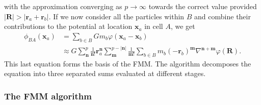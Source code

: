 with the approximation converging as $p\rightarrow\infty$ towards the
correct value provided $|\mathbf{R}|>|\mathbf{r}_a +
\mathbf{r}_b|$. If we now consider all the particles within $B$ and
combine their contributions to the potential at location
$\mathbf{x}_a$ in cell $A$, we get
\begin{align}
  \phi_{BA}(\mathbf{x}_a) &= \sum_{b\in B}G m_b\varphi(\mathbf{x}_a -
  \mathbf{x}_b)  \label{eq:fmm:fmm_one_cell}  \\
  &\approx G\sum_{\mathbf{n}}^{p}
  \frac{1}{\mathbf{n}!} \mathbf{r}_a^{\mathbf{n}} \sum_{\mathbf{m}}
    ^{p -|\mathbf{n}|}
  \frac{1}{\mathbf{m}!} \sum_{b\in B} m_b\left(-\mathbf{r}_b\right)^\mathbf{m}
  \nabla^{\mathbf{n}+\mathbf{m}} \varphi(\mathbf{R}) \nonumber. 
\end{align}
This last equation forms the basis of the FMM. The algorithm
decomposes the equation into three separated sums evaluated at
different stages.\\

\subsubsection{The FMM algorithm}

